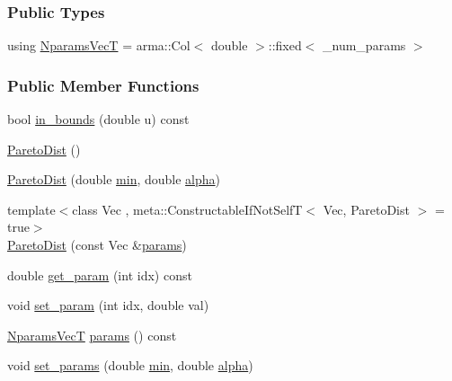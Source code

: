 \subsubsection*{Public Types}
\begin{DoxyCompactItemize}
\item 
using \hyperlink{classprior__hessian_1_1ParetoDist_a6ef572f82d7444830703d10f25007c3b}{Nparams\+VecT} = arma\+::\+Col$<$ double $>$\+::fixed$<$ \+\_\+num\+\_\+params $>$
\end{DoxyCompactItemize}
\subsubsection*{Public Member Functions}
\begin{DoxyCompactItemize}
\item 
bool \hyperlink{classprior__hessian_1_1ParetoDist_ae3776388549cf35e9fea96963624cf6e}{in\+\_\+bounds} (double u) const 
\item 
\hyperlink{classprior__hessian_1_1ParetoDist_a4a7caa4bc82a462a9d4af8e0ea9524e2}{Pareto\+Dist} ()
\item 
\hyperlink{classprior__hessian_1_1ParetoDist_a524d7d1ed76f0aa914cef3cab13cee29}{Pareto\+Dist} (double \hyperlink{classprior__hessian_1_1ParetoDist_acef10b17c003468838f548ed255d7e1f}{min}, double \hyperlink{classprior__hessian_1_1ParetoDist_ac610ecf8ce6df7b8b48c383e89706b80}{alpha})
\item 
{\footnotesize template$<$class Vec , meta\+::\+Constructable\+If\+Not\+Self\+T$<$ Vec, Pareto\+Dist $>$  = true$>$ }\\\hyperlink{classprior__hessian_1_1ParetoDist_a572ad9f28d83da610e1b81c88876563a}{Pareto\+Dist} (const Vec \&\hyperlink{classprior__hessian_1_1ParetoDist_af5791e2cef16b34e1bbdeec24b13d22e}{params})
\item 
double \hyperlink{classprior__hessian_1_1ParetoDist_adc9bafea285be38186ec4ad161850b56}{get\+\_\+param} (int idx) const 
\item 
void \hyperlink{classprior__hessian_1_1ParetoDist_acea61a99a86906efba7fed853e408a59}{set\+\_\+param} (int idx, double val)
\item 
\hyperlink{classprior__hessian_1_1ParetoDist_a6ef572f82d7444830703d10f25007c3b}{Nparams\+VecT} \hyperlink{classprior__hessian_1_1ParetoDist_af5791e2cef16b34e1bbdeec24b13d22e}{params} () const 
\item 
void \hyperlink{classprior__hessian_1_1ParetoDist_a218ebbdec10fbdfcaabdd79dd180b39e}{set\+\_\+params} (double \hyperlink{classprior__hessian_1_1ParetoDist_acef10b17c003468838f548ed255d7e1f}{min}, double \hyperlink{classprior__hessian_1_1ParetoDist_ac610ecf8ce6df7b8b48c383e89706b80}{alpha})

\end{DoxyCompactItemize}
